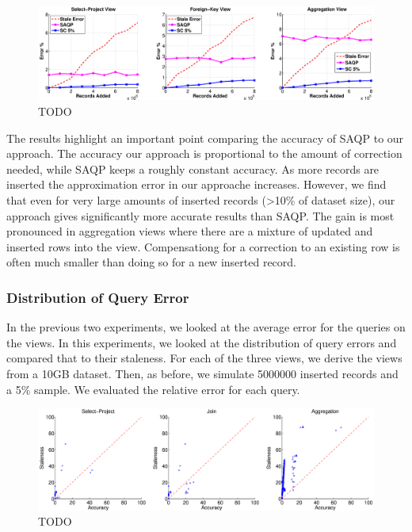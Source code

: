 \begin{figure}[ht!]
\label{exp2update}
\centering
 \includegraphics[width=\textwidth]{exp/exp2-updatesize-accuracy.eps}
 \caption{TODO}
\end{figure}

The results highlight an important point comparing the accuracy of SAQP to our approach. 
The accuracy our approach is proportional to the amount of correction needed, while SAQP keeps a roughly constant accuracy.
As more records are inserted the approximation error in our approache increases.
However, we find that even for very large amounts of inserted records (>10\% of dataset size), our approach gives significantly more accurate results
than SAQP.
The gain is most pronounced in aggregation views where there are a mixture of updated and inserted rows into the view.
Compensationg for a correction to an existing row is often much smaller than doing so for a new inserted record.

\subsubsection{Distribution of Query Error}
In the previous two experiments, we looked at the average error for the queries on the views.
In this experiments, we looked at the distribution of query errors and compared that to their staleness.
For each of the three views, we derive the views from a 10GB dataset.
Then, as before, we simulate 5000000 inserted records and a 5\% sample.
We evaluated the relative error for each query.

\begin{figure}[ht!]
\label{exp3dist}
\centering
 \includegraphics[width=\textwidth]{exp/exp3-query-error-dist.eps}
 \caption{TODO}
\end{figure}

